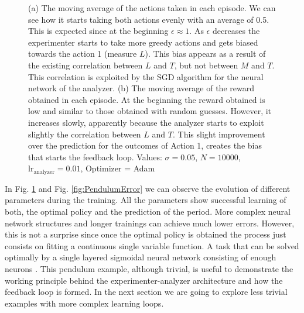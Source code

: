 \documentclass[11pt,a4paper,twoside]{report}
\newcommand{\+}{\textnormal{+} }
\theoremstyle{definition}
\numberwithin{equation}{chapter}
\begin{document}
\begin{figure}[h]
  \caption{(a) The moving average of the actions taken in each episode. We can
  see how it starts taking both actions evenly with an average of 0.5. This is
  expected since at the beginning $\epsilon \approx 1$. As $\epsilon$ decreases
  the experimenter starts to take more greedy actions and gets biased towards
  the action 1 (measure $L$). This bias appears as a result of the existing
  correlation between $L$ and $T$, but not between $M$ and $T$. This correlation
  is exploited by the SGD algorithm for the neural network of the analyzer. (b)
  The moving average of the reward obtained in each episode. At the beginning
  the reward obtained is low and similar to those obtained with random guesses.
  However, it increases slowly, apparently because the analyzer starts to
  exploit slightly the correlation between $L$ and $T$. This slight improvement
  over the prediction for the outcomes of Action 1, creates the bias that starts
  the feedback loop. Values: $\sigma=0.05$, $N=10000$,
  $\text{lr}_\text{analyzer}=0.01$, Optimizer = Adam}
  \label{fig:PendulumTraining}
  \end{figure}

  In Fig. \ref{fig:PendulumTraining} and Fig. \ref{fig:PendulumError} we can
  observe the evolution of different parameters during the training. All the
  parameters show successful learning of both, the optimal policy and the
  prediction of the period. More complex neural network structures and longer
  trainings can achieve much lower errors. However, this is not a surprise since
  once the optimal policy is obtained the process just consists on fitting a
  continuous single variable function. A task that can be solved optimally by a
  single layered sigmoidal neural network consisting of enough neurons
  \cite{cybenko1989approximation}. This pendulum example, although trivial, is
  useful to demonstrate the working principle behind the experimenter-analyzer
  architecture and how the feedback loop is formed. In the next section we are
  going to explore less trivial examples with more complex learning loops.
\end{document}
